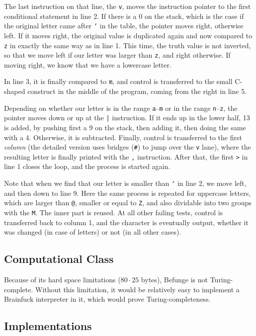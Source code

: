 The last instruction on that line, the \texttt{v}, moves the instruction pointer to the first conditional statement in line 2. If there is a 0 on the stack, which is the case if the original letter came after \texttt{`} in the \ascii{} table, the pointer moves right, otherwise left. If it moves right, the original value is duplicated again and now compared to \texttt{z} in exactly the same way as in line 1. This time, the truth value is not inverted, so that we move left if our letter was larger than \texttt{z}, and right otherwise. If moving right, we know that we have a lowercase letter.

In line 3, it is finally compared to \texttt{m}, and control is transferred to the small C-shaped construct in the middle of the program, coming from the right in line 5.

Depending on whether our letter is in the range \texttt{a}--\texttt{m} or in the range \texttt{n}--\texttt{z}, the pointer moves down or up at the \texttt{|} instruction. If it ends up in the lower half, 13 is added, by pushing first a 9 on the stack, then adding it, then doing the same with a 4. Otherwise, it is subtracted. Finally, control is transferred to the first \emph{column} (the detailed version uses bridges (\texttt{\#}) to jump over the \texttt{v} lane), where the resulting letter is finally printed with the \texttt{,} instruction. After that, the first \texttt{>} in line 1 closes the loop, and the process is started again.

Note that when we find that our letter is smaller than \texttt{`} in line 2, we move left, and then down to line 9. Here the same process is repeated for uppercase letters, which are larger than \texttt{@}, smaller or equal to \texttt{Z}, and also dividable into two groups with the \texttt{M}. The inner part is reused. At all other failing tests, control is transferred back to column 1, and the character is eventually output, whether it was changed (in case of letters) or not (in all other cases).

\subsection{Computational Class}

Because of its hard space limitations ($80\cdot 25$ bytes), Befunge is not Turing-complete. Without this limitation, it would be relatively easy to implement a Brainfuck interpreter in it, which would prove Turing-completeness.

\subsection{Implementations}

